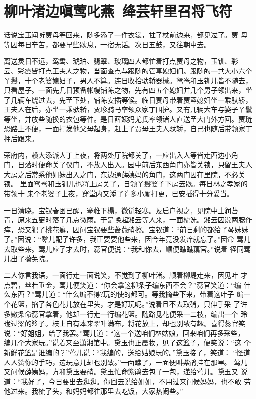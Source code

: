 \chapter{柳叶渚边嗔莺叱燕~绛芸轩里召将飞符}

话说宝玉闻听贾母等回来，随多添了一件衣裳，拄了杖前边来，都见过了。贾
母等因每日辛苦，都要早些歇息，一宿无话。次日五鼓，又往朝中去。

离送灵日不远，鸳鸯、琥珀、翡翠、玻璃四人都忙着打点贾母之物，玉钏、彩
云、彩霞皆打点王夫人之物，当面查点与跟随的管事媳妇们。跟随的一共大小六个
丫鬟，十个老婆媳妇子，男人不算。连日收拾驮轿器械。鸳鸯和玉钏儿皆不随去，
只看屋子。一面先几日预备帐幔铺陈之物，先有四五个媳妇并几个男子领出来，坐
了几辆车绕过去，先至下处，铺陈安插等候。临日贾母带着贾蓉媳妇坐一乘驮轿，
王夫人在后，亦坐一乘驮轿，贾珍骑马率领众家丁围护。又有几辆大车与婆子丫鬟
等坐，并放些随换的衣包等件。是日薛姨妈尤氏率领诸人直送至大门外方回。贾琏
恐路上不便，一面打发他父母起身，赶上了贾母王夫人驮轿，自己也随后带领家丁
押后跟来。

荣府内，赖大添派人丁上夜，将两处厅院都关了，一应出入人等皆走西边小角
门，日落时便命关了仪门，不放人出入。园中前后东西角门亦皆关锁，只留王夫人
大房之后常系他姐妹出入之门，东边通薛姨妈的角门，这两门因在里院，不必关锁。
里面鸳鸯和玉钏儿也将上房关了，自领丫鬟婆子下房去歇。每日林之孝家的带领十
来个老婆子上夜，穿堂内又添了许多小厮打更，已安插得十分妥当。

一日清晓，宝钗春困已醒，搴帷下榻，微觉轻寒。及启户视之，见院中土润苔
青，原来五更时落了几点微雨。于是唤起湘云等人来，一面梳洗。湘云因说两腮作
痒，恐又犯了桃花癣，因问宝钗要些蔷薇硝擦。宝钗道：“前日剩的都给了琴妹妹
了。”因说：“颦儿配了许多，我正要要他些来，因今年竟没发痒就忘了。”因命
莺儿去取些来。莺儿应了才去时，蕊官便说：“我和你去，顺便瞧瞧藕官。”说着
径同莺儿出了蘅芜院。

二人你言我语，一面行走一面说笑，不觉到了柳叶渚。顺着柳堤走来，因见叶
才点碧，丝若垂金，莺儿便笑道：“你会拿这柳条子编东西不会？”蕊官笑道：“编
什么东西？”莺儿道：“什么编不得?玩的使的都可。等我摘些下来，带着这叶子
编一个花篮，掐了各色花儿放在里头，才是好玩呢。”说着且不去取硝，只伸手采
了许多嫩条命蕊官拿着，他却一行走一行编花篮。随路见花便采一二枝，编出一个
玲珑过梁的篮子。枝上自有本来翠叶满布，将花放上，却也别致有趣。喜得蕊官笑
说：“好姐姐，给了我罢。”莺儿道：“这一个送咱们林姑娘，回来咱们再多采些，
编几个大家玩。”说着来至潇湘馆中。黛玉也正晨妆，见了这篮子，便笑说：“这
个新鲜花篮是谁编的？”莺儿说：“我编的，送给姑娘玩的。”黛玉接了，笑道：
“怪道人人赞你的手巧，这玩意儿却也别致。”一面瞧了，一面便叫紫鹃挂在那里。
莺儿又问候薛姨妈，方和黛玉要硝。黛玉忙命紫鹃去包了一包，递给莺儿。黛玉又
说道：“我好了，今日要出去逛逛。你回去说给姐姐，不用过来问候妈妈，也不敢
劳他过来。我梳了头，和妈妈都往那里去吃饭，大家热闹些。”


